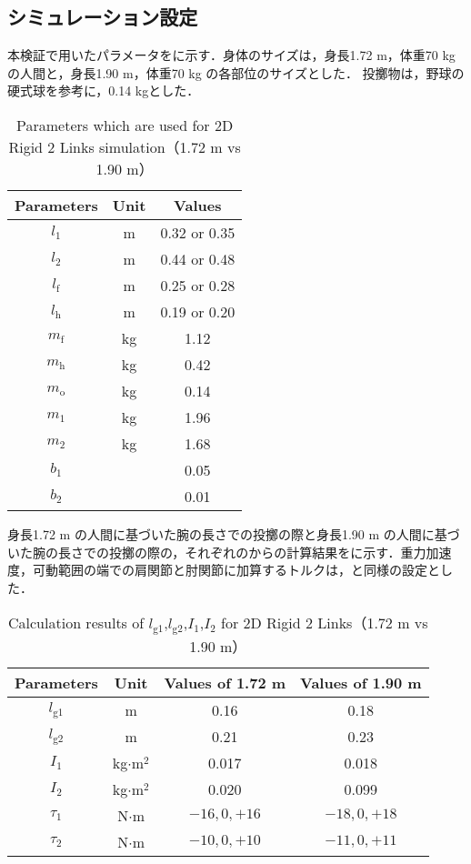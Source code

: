 \subsection{シミュレーション設定}
本検証で用いたパラメータをに示す．身体のサイズは，身長1.72 m，体重70 kgの人間と，身長1.90 m，体重70 kg の各部位のサイズとした．
投擲物は，野球の硬式球を参考に，0.14 kgとした．
\begin{table}[tb]
  \begin{center}
    \caption{Parameters which are used for 2D Rigid 2 Links simulation（1.72 m vs 1.90 m）}
    \begin{tabular}{c|c|c}
      \hline
      Parameters & Unit & Values \\
      \hline
      $l_{1}$ & m & 0.32 or 0.35 \\
      $l_{2}$ & m & 0.44 or 0.48 \\
      $l_{\mathrm{f}}$ & m & 0.25 or 0.28 \\
      $l_{\mathrm{h}}$ & m & 0.19 or 0.20 \\
      $m_{\mathrm{f}}$ & kg & 1.12 \\
      $m_{\mathrm{h}}$ & kg & 0.42 \\
      $m_{\mathrm{o}}$ & kg & 0.14 \\
      $m_{1}$ & kg & 1.96 \\
      $m_{2}$ & kg & 1.68 \\
      $b_{1}$ &  & 0.05 \\
      $b_{2}$ &  & 0.01 \\
      \hline
    \end{tabular}
  \end{center}
\end{table}


身長1.72 m の人間に基づいた腕の長さでの投擲の際と身長1.90 m の人間に基づいた腕の長さでの投擲の際の，それぞれのからの計算結果をに示す．重力加速度，可動範囲の端での肩関節と肘関節に加算するトルクは，と同様の設定とした．

\begin{table}[tb]
  \begin{center}
    \caption{Calculation results of $l_{\mathrm{g1}}$,$l_{\mathrm{g2}}$,$I_{1}$,$I_{2}$ for 2D Rigid 2 Links（1.72 m vs 1.90 m）}
    \begin{tabular}{c|c|c|c}
      \hline
      Parameters & Unit & Values of 1.72 m & Values of 1.90 m \\
      \hline
      $l_{\mathrm{g1}}$ & m & 0.16 & 0.18 \\
      $l_{\mathrm{g2}}$ & m & 0.21 & 0.23 \\
      $I_{1}$ & kg$\cdot$$\mathrm{m}^2$ & 0.017 & 0.018 \\
      $I_{2}$ & kg$\cdot$$\mathrm{m}^2$ & 0.020 & 0.099 \\
      $\tau_{1}$ & N$\cdot$m & $-16, 0, +16$ & $-18, 0, +18$ \\
      $\tau_{2}$ & N$\cdot$m & $-10, 0, +10$ & $-11, 0, +11$ \\
      \hline
    \end{tabular}
  \end{center}
\end{table}

